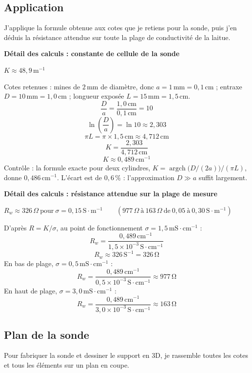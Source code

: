 \documentclass[11pt,a4paper]{article}
\newcommand{\resultat}[1]{\begin{center}{\large\color{bleuENO}$\displaystyle #1$}\end{center}}
\newcommand{\calcul}[2]{\par\medskip\noindent\textbf{Détail des calculs : #1}\par\nopagebreak\resultat{#2}}
\newcommand{\U}[1]{\,\mathrm{#1}}
\begin{document}
\subsection{Application}

J'applique la formule obtenue aux cotes que je retiens pour la sonde, puis j'en déduis la résistance attendue sur toute la plage de conductivité de la laitue.


\calcul{constante de cellule de la sonde}{K \approx 48{,}9\,\mathrm{m^{-1}}}
Cotes retenues : mines de $2\U{mm}$ de diamètre, donc $a = 1\U{mm} = 0{,}1\U{cm}$ ; entraxe $D = 10\U{mm} = 1{,}0\U{cm}$ ; longueur exposée $L = 15\U{mm} = 1{,}5\U{cm}$.
\[
\frac{D}{a} = \frac{1{,}0\U{cm}}{0{,}1\U{cm}} = 10
\]
\[
\ln\!\left(\frac{D}{a}\right) = \ln 10 \approx 2{,}303
\]
\[
\pi L = \pi \times 1{,}5\U{cm} \approx 4{,}712\U{cm}
\]
\[
K = \frac{2{,}303}{4{,}712\U{cm}}
\]
\[
K \approx 0{,}489\U{cm^{-1}}
\]
Contrôle : la formule exacte pour deux cylindres, $K = \operatorname{argch}\!\big(D/(2a)\big) / (\pi L)$, donne $0{,}486\U{cm^{-1}}$. L'écart est de $0{,}6\U{\%}$ : l'approximation $D \gg a$ suffit largement.

\calcul{résistance attendue sur la plage de mesure}{R_w \approx 326\,\Omega \ \text{pour}\ \sigma = 0{,}15\,\mathrm{S \cdot m^{-1}} \qquad (977\,\Omega \ \text{à}\ 163\,\Omega \ \text{de}\ 0{,}05\ \text{à}\ 0{,}30\,\mathrm{S \cdot m^{-1}})}
D'après $R = K / \sigma$, au point de fonctionnement $\sigma = 1{,}5\U{mS \cdot cm^{-1}}$ :
\[
R_w = \frac{0{,}489\U{cm^{-1}}}{1{,}5 \times 10^{-3}\U{S \cdot cm^{-1}}}
\]
\[
R_w \approx 326\U{S^{-1}} = 326\U{\Omega}
\]
En bas de plage, $\sigma = 0{,}5\U{mS \cdot cm^{-1}}$ :
\[
R_w = \frac{0{,}489\U{cm^{-1}}}{0{,}5 \times 10^{-3}\U{S \cdot cm^{-1}}} \approx 977\U{\Omega}
\]
En haut de plage, $\sigma = 3{,}0\U{mS \cdot cm^{-1}}$ :
\[
R_w = \frac{0{,}489\U{cm^{-1}}}{3{,}0 \times 10^{-3}\U{S \cdot cm^{-1}}} \approx 163\U{\Omega}
\]

\subsection{Plan de la sonde}

Pour fabriquer la sonde et dessiner le support en 3D, je rassemble toutes les cotes et tous les éléments sur un plan en coupe.
\end{document}
